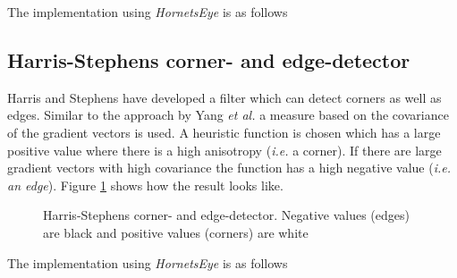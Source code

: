 \documentclass[a4paper,12pt]{book}
\begin{document}
The implementation using \emph{HornetsEye} is as follows
\begin{scriptsize}
  
\end{scriptsize}

\subsection{Harris-Stephens corner- and edge-detector}
Harris and Stephens have developed a filter which can detect corners
as well as edges\cite{RefWorks:348}. Similar to the approach by Yang \emph{et al.}
a measure based on the covariance of the gradient vectors is used.
A heuristic function is chosen which has a large positive value where there
is a high anisotropy (\emph{i.e.} a corner). If there are large gradient
vectors with high covariance the function has a high negative value
(\emph{i.e. an edge})\cite{RefWorks:349}. Figure \ref{fig:hs} shows how the
result looks like.
\begin{figure}[htbp]
   \begin{center}
     \begin{minipage}[c]{.45\textwidth}
     \end{minipage}
     \begin{minipage}[c]{.45\textwidth}
       \resizebox{\textwidth}{!}{\texttt{[image: h\_s]}}
     \end{minipage}
     \caption{Harris-Stephens corner- and edge-detector. Negative values
       (edges) are black and positive values (corners) are white\label{fig:hs}}
   \end{center} %
\end{figure}

The implementation using \emph{HornetsEye} is as follows
\begin{scriptsize}
  
\end{scriptsize}
\end{document}
